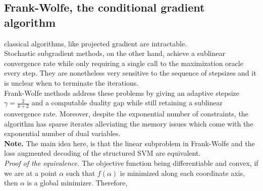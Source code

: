 \subsection{Frank-Wolfe, the conditional gradient algorithm}
classical algorithms, like projected gradient are intractable. \\
Stochastic subgradient methods, on the other hand, achieve a sublinear
convergence rate while only requiring a single call to the maximization oracle
every step. They are nonetheless very sensitive to the sequence of stepsizes and
it is unclear when to terminate the iterations. \\

Frank-Wolfe methods address these problems by giving an adaptive stepsize
$\gamma= \frac{2}{k+2}$ and a computable duality gap while still retaining a
sublinear convergence rate. Moreover, despite the exponential number of
constraints, the algorithm has sparse iterates alleviating the memory issues
which come with the exponential number of dual variables.\\
\textbf{Note.} The main idea here, is that the linear subproblem in Frank-Wolfe
and the loss augmented decoding of the structured SVM are equivalent. \\

\textit{Proof of the equivalence.} The objective function being differentiable
and convex, if we are at a point $\alpha$ such that $f(\alpha)$ is minimized
along each coordinate axis, then $\alpha$ is
a global minimizer. Therefore,

